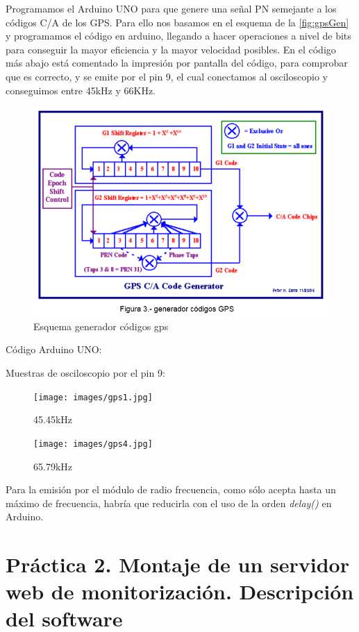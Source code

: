 \documentclass[]{article}
\begin{document}
Programamos el Arduino UNO para que genere una señal PN semejante a los códigos C/A de los GPS. Para ello nos basamos en el esquema de la \autoref{fig:gpsGen} y programamos el código en arduino, llegando a hacer operaciones a nivel de bits para conseguir la mayor eficiencia y la mayor velocidad posibles. En el código más abajo está comentado la impresión por pantalla del código, para comprobar que es correcto, y se emite por el pin 9, el cual conectamos al osciloscopio y conseguimos entre 45kHz y 66KHz.

\begin{figure}[h!]
	\centering
	\includegraphics[width=0.6\linewidth]{images/gpsGen.PNG}
	\caption{Esquema generador códigos gps}
	\label{fig:gpsGen}
\end{figure}

Código Arduino UNO:



Muestras de osciloscopio por el pin 9:

\begin{figure}[h!]
	\centering
	\texttt{[image: images/gps1.jpg]}
	\caption{45.45kHz}
	\label{fig:gps1}
\end{figure}

\begin{figure}[h!]
	\centering
	\texttt{[image: images/gps4.jpg]}
	\caption{65.79kHz}
	\label{fig:gps4}
\end{figure}

Para la emisión por el módulo de radio frecuencia, como sólo acepta hasta un máximo de frecuencia, habría que reducirla con el uso de la orden \textit{delay()} en Arduino.


\section{Práctica 2. Montaje de un servidor web de monitorización. Descripción del software}
\end{document}
